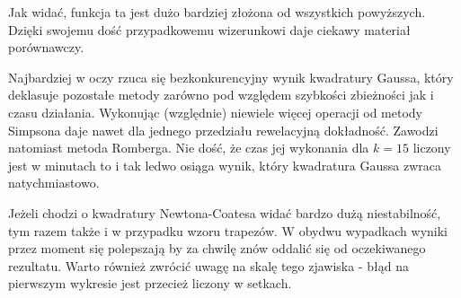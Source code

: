 \documentclass[11pt,leqno]{article}
\begin{document}
Jak widać, funkcja ta jest dużo bardziej złożona od wszystkich powyższych. Dzięki swojemu dość przypadkowemu wizerunkowi daje ciekawy materiał porównawczy.

Najbardziej w oczy rzuca się bezkonkurencyjny wynik kwadratury Gaussa, który deklasuje pozostałe metody zarówno pod względem szybkości zbieżności jak i czasu działania. Wykonując (względnie) niewiele więcej operacji od metody Simpsona daje nawet dla jednego przedziału rewelacyjną dokładność.
Zawodzi natomiast metoda Romberga. Nie dość, że czas jej wykonania dla $k = 15$ liczony jest w minutach to i tak ledwo osiąga wynik, który kwadratura Gaussa zwraca natychmiastowo.

Jeżeli chodzi o kwadratury Newtona-Coatesa widać bardzo dużą niestabilność, tym razem także i w przypadku wzoru trapezów. W obydwu wypadkach wyniki przez moment się polepszają by za chwilę znów oddalić się od oczekiwanego rezultatu. Warto również zwrócić uwagę na skalę tego zjawiska - błąd na pierwszym wykresie jest przecież liczony w setkach.
\end{document}
